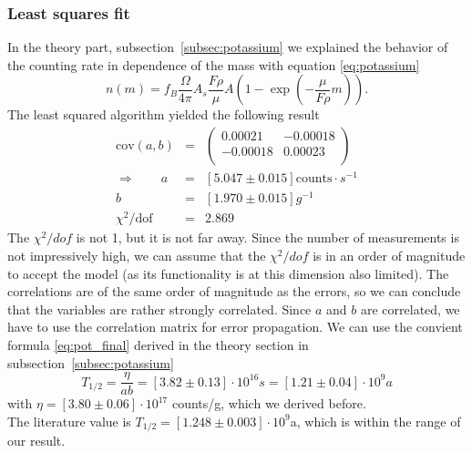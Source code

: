 \subsubsection{Least squares fit}
In the theory part, subsection~\ref{subsec:potassium} we explained the 
behavior of the counting rate in dependence of the mass with
equation \eqref{eq:potassium}
\begin{equation*}
n(m) = f_B \frac{\Omega}{4 \pi} A_s \frac{F \rho }{\mu}A \left (1 - \exp \left ( - \frac{\mu}{F \rho}m \right ) \right ).
\end{equation*}
The least squared algorithm yielded the following result
\begin{eqnarray}
    \mathrm{cov}(a,b) &=& 
    \begin{pmatrix}
        0.00021 &-0.00018 \\
        -0.00018 &0.00023 \\
    \end{pmatrix}\\
 \Rightarrow \qquad
    a &=& \left [ 5.047 \pm 0.015 \right ] \text{counts} \cdot s^{-1} \\
    b &=& \left [ 1.970 \pm 0.015 \right ] g^{-1} \\
    \chi^2/\mathrm{dof} &=& 2.869 
\end{eqnarray}
The $\chi^2/dof$ is not 1, but it is not far away. Since the number of measurements is not impressively high, we
can assume that the $\chi^2/dof$ is in an order of magnitude to accept the model (as its functionality is at this
dimension also limited). The correlations are of the same order of magnitude as the errors, so we can conclude that
the variables are rather strongly correlated.
Since $a$ and $b$ are correlated, we have to use the correlation matrix for
error propagation. We can use the convient formula \eqref{eq:pot_final} derived
in the theory section in subsection~\ref{subsec:potassium}
\begin{equation*}
T_{1/2} = \frac{\eta}{a b} = [3.82\pm0.13]\cdot 10^{16} s = [1.21 \pm 0.04]\cdot 10^9 a
\end{equation*}
with $\eta = [3.80 \pm 0.06]\cdot 10^{17}$ counts/g, which we derived before.\\
The literature value is $T_{1/2} = [1.248 \pm 0.003]\cdot10^9$a, which is within the range of our result. 

